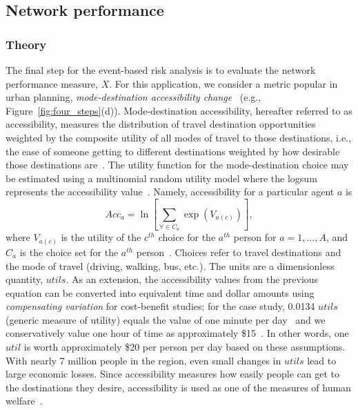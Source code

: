\subsection{Network performance}
\subsubsection{Theory}
The final step for the event-based risk analysis is to evaluate the network performance measure, $X$. For this application, we consider a metric popular in urban planning, \emph{mode-destination accessibility change}~\cite[e.g.,][]{geurs_accessibility_2004,kockelman_travel_1997,waddell_incorporating_2002}  (e.g., Figure~\ref{fig:four_steps}{(d)}). Mode-destination accessibility, hereafter referred to as accessibility, measures the distribution of travel destination opportunities weighted by the composite utility of all modes of travel to those destinations, i.e., the ease of someone getting to different destinations weighted by how desirable those destinations are~\cite{handy_measuring_1997,niemeier_accessibility:_1997}. The utility function for the mode-destination choice may be estimated using a multinomial random utility model where the logsum represents the accessibility value~\cite{manski_structural_1981,handy_measuring_1997,niemeier_accessibility:_1997}. Namely, accessibility for a particular agent $a$ is
\begin{equation}
Acc_a = \ln \left[ \sum_{\forall \in C_a} \exp (V_{a(c)}) \right],
\label{eq:acc}
\end{equation}
where $V_{a(c)}$ is the utility of the $c^{th}$ choice for the $a^{th}$ person for $a = 1, \ldots, A$, and $C_a$ is the choice set for the $a^{th}$ person~\cite{handy_measuring_1997}. Choices refer to travel destinations and the mode of travel (driving, walking, bus, etc.). The units are a dimensionless quantity, $utils$. As an extension, the accessibility values from the previous equation can be converted into equivalent time and dollar amounts using \emph{compensating variation} for cost-benefit studies; for the case study, 0.0134 $utils$ (generic measure of utility) equals the value of one minute per day~\cite{niemeier_accessibility:_1997,small_applied_1981,ory_personal_2013} and we conservatively value one hour of time as approximately \$15~\cite{united_states_department_of_transportation_revised_2011}. In other words, one $util$ is worth approximately \$20 per person per day based on these assumptions. With nearly 7 million people in the region, even small changes in $utils$ lead to large economic losses. Since accessibility measures how easily people can get to the destinations they desire, accessibility is used as one of the measures of human welfare~\cite[e.g.,][]{niemeier_accessibility:_1997}.

